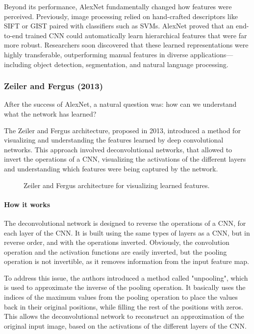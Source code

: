 Beyond its performance, AlexNet fundamentally changed how features were perceived. 
Previously, image processing relied on hand-crafted descriptors like SIFT or GIST paired with classifiers such as SVMs. 
AlexNet proved that an end-to-end trained CNN could automatically learn hierarchical features that were far more robust. 
Researchers soon discovered that these learned representations were highly transferable, outperforming manual features in diverse applications—including object detection, 
segmentation, and natural language processing.

\subsubsection{Zeiler and Fergus (2013)}
After the success of AlexNet, a natural question was: how can we understand what the network has learned?

The Zeiler and Fergus architecture, proposed in 2013, introduced a method for visualizing and understanding the features learned by deep convolutional networks. 
This approach involved deconvolutional networks, that allowed to invert the operations of a CNN, visualizing the activations of the different layers and understanding which features were being captured by the network.
\begin{figure}[H]
    \centering
    
    \caption{Zeiler and Fergus architecture for visualizing learned features.}
    \label{fig:deconvolutionalNN}
\end{figure}
\paragraph{How it works}
The deconvolutional network is designed to reverse the operations of a CNN, for each layer of the CNN. 
It is built using the same types of layers as a CNN, but in reverse order, and with the operations inverted.
Obviously, the convolution operation and the activation functions are easily inverted, but the pooling operation 
is not invertible, as it removes information from the input feature map.

To address this issue, the authors introduced a method called "unpooling", which is used to approximate the inverse of the pooling operation.
It basically uses the indices of the maximum values from the pooling operation to place the values back in their original positions, while filling the rest of the positions with zeros.
This allows the deconvolutional network to reconstruct an approximation of the original input image, based on the activations of the different layers of the CNN.

